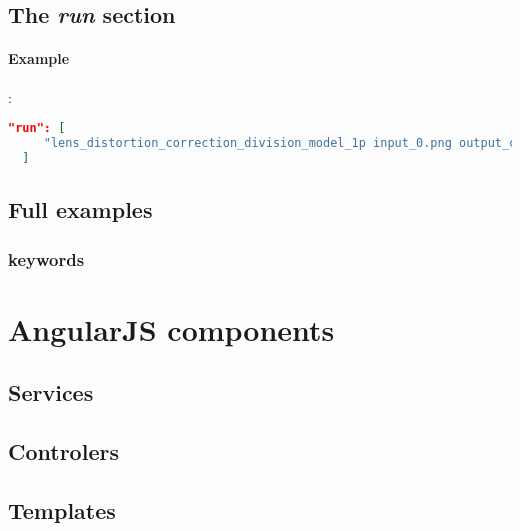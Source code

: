 \subsection{The \emph{run} section}

\paragraph{Example}:\\
\begin{lstlisting}[language=json,firstnumber=1]
  "run": [
     "lens_distortion_correction_division_model_1p input_0.png output_canny.png output_hough.png output_corrected_image.png $high_threshold_canny $initial_distortion_parameter $final_distortion_parameter $distance_point_line_max_hough $angle_point_orientation_max_difference primitives.txt"
  ]
\end{lstlisting}

\subsection{Full examples}


\subsubsection{keywords}

\section{AngularJS components}
\subsection{Services}
\subsection{Controlers}
\subsection{Templates}
